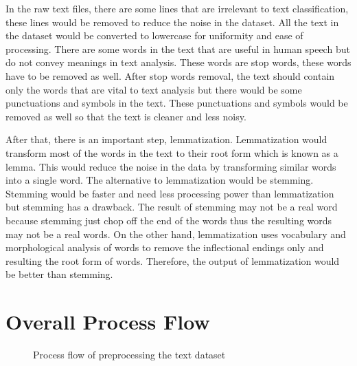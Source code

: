 In the raw text files, there are some lines that are irrelevant to text classification, these lines would be removed to reduce the noise in the dataset. All the text in the dataset would be converted to lowercase for uniformity and ease of processing. There are some words in the text that are useful in human speech but do not convey meanings in text analysis. These words are stop words, these words have to be removed as well. After stop words removal, the text should contain only the words that are vital to text analysis but there would be some punctuations and symbols in the text. These punctuations and symbols would be removed as well so that the text is cleaner and less noisy.

After that, there is an important step, lemmatization. Lemmatization would transform most of the words in the text to their root form which is known as a lemma. This would reduce the noise in the data by transforming similar words into a single word. The alternative to lemmatization would be stemming. Stemming would be faster and need less processing power than lemmatization but stemming has a drawback. The result of stemming may not be a real word because stemming just chop off the end of the words thus the resulting words may not be a real words. On the other hand, lemmatization uses vocabulary and morphological analysis of words to remove the inflectional endings only and resulting the root form of words. \cite{stemLemma} Therefore, the output of lemmatization would be better than stemming.

\clearpage
\section{Overall Process Flow}
\begin{figure} [ht]
\centering
{}
\caption{Process flow of preprocessing the text dataset}
\label{fig: preprocessText}
\end{figure}


